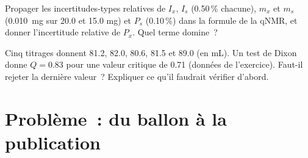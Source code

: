 \begin{exercise}[$\star\star\star$]\label{exo:b3:lab-techniques-3:11}
Propager les incertitudes-types relatives de $I_x$, $I_s$ (0.50\,\% chacune), $m_x$ et $m_s$ (\qty{0.010}{mg} sur 20.0
et 15.0 mg) et $P_s$ (0.10\,\%) dans la formule de la qNMR, et donner l'incertitude relative de $P_x$.
Quel terme domine~?
\end{exercise}

\begin{exercise}[$\star\star\star$]\label{exo:b3:lab-techniques-3:12}
Cinq titrages donnent 81.2, 82.0, 80.6, 81.5 et 89.0 (en mL). Un test de
Dixon donne
$Q = 0.83$ pour une valeur critique de 0.71 (données de l'exercice). Faut-il rejeter la dernière
valeur~? Expliquer ce qu'il faudrait vérifier d'abord.
\end{exercise}

\section{Problème~: du ballon à la publication}


